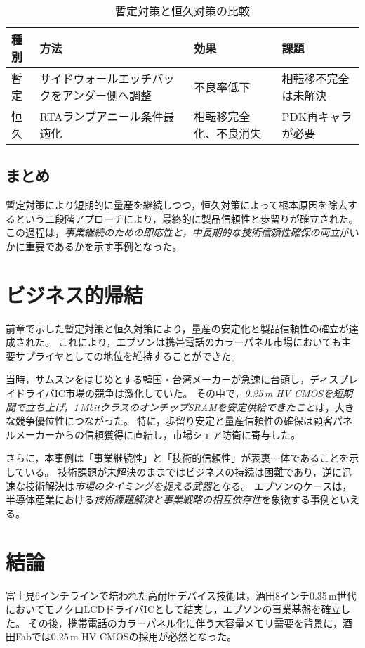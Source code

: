 \documentclass[conference]{IEEEtran}
\begin{document}
\begin{table}[H]
\centering
\caption{暫定対策と恒久対策の比較}
\label{tab:countermeasures}
\begin{tabular}{llll}
\toprule
種別 & 方法 & 効果 & 課題 \\
\midrule
暫定 & サイドウォールエッチバックをアンダー側へ調整 &
不良率低下 & 相転移不完全は未解決 \\
恒久 & RTAランプアニール条件最適化 &
相転移完全化、不良消失 & PDK再キャラが必要 \\
\bottomrule
\end{tabular}
\end{table}

\subsection{まとめ}
暫定対策により短期的に量産を継続しつつ，恒久対策によって根本原因を除去するという二段階アプローチにより，最終的に製品信頼性と歩留りが確立された。  
この過程は，\emph{事業継続のための即応性と，中長期的な技術信頼性確保の両立}がいかに重要であるかを示す事例となった。

\section{ビジネス的帰結}
前章で示した暫定対策と恒久対策により，量産の安定化と製品信頼性の確立が達成された。  
これにより，エプソンは携帯電話のカラーパネル市場においても主要サプライヤとしての地位を維持することができた。  

当時，サムスンをはじめとする韓国・台湾メーカーが急速に台頭し，ディスプレイドライバIC市場の競争は激化していた。  
その中で，\emph{0.25\,\textmu m HV CMOSを短期間で立ち上げ，1\,MbitクラスのオンチップSRAMを安定供給できたこと}は，大きな競争優位性につながった。  
特に，歩留り安定と量産信頼性の確保は顧客パネルメーカーからの信頼獲得に直結し，市場シェア防衛に寄与した。  

さらに，本事例は「事業継続性」と「技術的信頼性」が表裏一体であることを示している。  
技術課題が未解決のままではビジネスの持続は困難であり，逆に迅速な技術解決は\emph{市場のタイミングを捉える武器}となる。  
エプソンのケースは，半導体産業における\emph{技術課題解決と事業戦略の相互依存性}を象徴する事例といえる。

\section{結論}
富士見6インチラインで培われた高耐圧デバイス技術は，酒田8インチ0.35\,\textmu m世代においてモノクロLCDドライバICとして結実し，エプソンの事業基盤を確立した。  
その後，携帯電話のカラーパネル化に伴う大容量メモリ需要を背景に，酒田Fabでは0.25\,\textmu m HV CMOSの採用が必然となった。  
\end{document}
